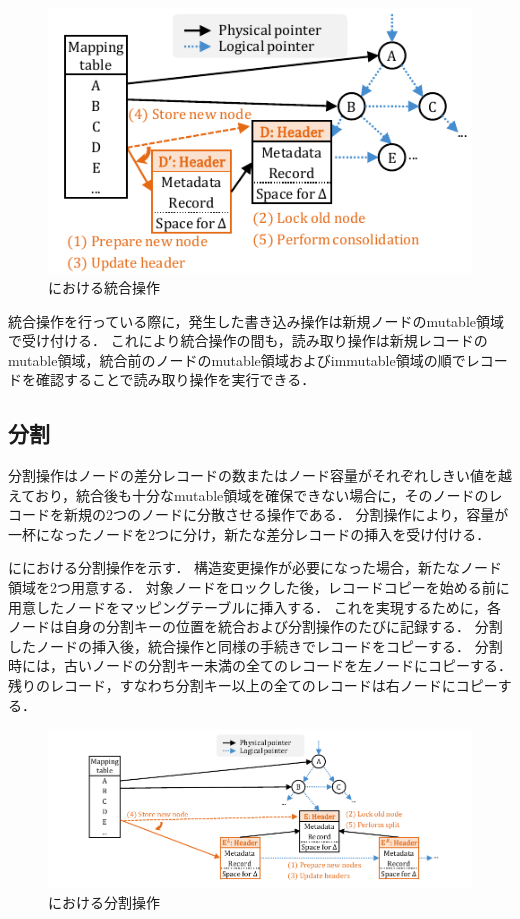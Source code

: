 \begin{figure}[t]
    \centering
    \includegraphics{./figures/Bc-consolidate.pdf}
    \caption{\Bctree{}における統合操作}
    \label{fig:bc_tree_consolidastion}
\end{figure}

統合操作を行っている際に，発生した書き込み操作は新規ノードのmutable領域で受け付ける．
これにより統合操作の間も，読み取り操作は新規レコードのmutable領域，統合前のノードのmutable領域およびimmutable領域の順でレコードを確認することで読み取り操作を実行できる．

\subsection{分割}

分割操作はノードの差分レコードの数またはノード容量がそれぞれしきい値を越えており，統合後も十分なmutable領域を確保できない場合に，そのノードのレコードを新規の2つのノードに分散させる操作である．
分割操作により，容量が一杯になったノードを2つに分け，新たな差分レコードの挿入を受け付ける．

\Fig{\ref{fig:bc_tree_split}}に\Bctree{}における分割操作を示す．
構造変更操作が必要になった場合，新たなノード領域を2つ用意する．
対象ノードをロックした後，レコードコピーを始める前に用意したノードをマッピングテーブルに挿入する．
これを実現するために，各ノードは自身の分割キーの位置を統合および分割操作のたびに記録する．
分割したノードの挿入後，統合操作と同様の手続きでレコードをコピーする．
分割時には，古いノードの分割キー未満の全てのレコードを左ノードにコピーする．
残りのレコード，すなわち分割キー以上の全てのレコードは右ノードにコピーする．

\begin{figure}[t]
    \centering
    \includegraphics{./figures/Bc-split.pdf}
    \caption{\Bctree{}における分割操作}
    \label{fig:bc_tree_split}
\end{figure}

